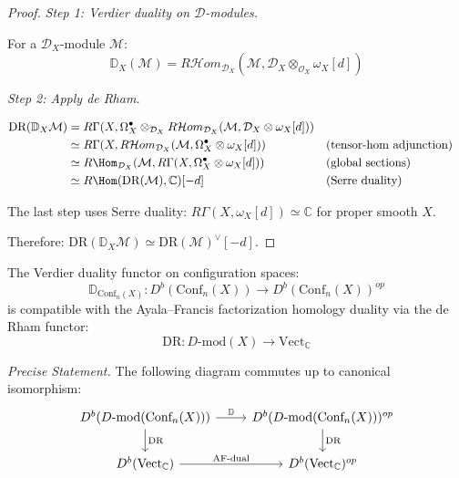 \begin{proof}
\emph{Step 1: Verdier duality on $\mathcal{D}$-modules.}

For a $\mathcal{D}_X$-module $\mathcal{M}$:
\[\mathbb{D}_X(\mathcal{M}) = R\mathcal{H}om_{\mathcal{D}_X}(\mathcal{M}, \mathcal{D}_X \otimes_{\mathcal{O}_X} \omega_X[d])\]

\emph{Step 2: Apply de Rham.}

\begin{align*}
\text{DR}(\mathbb{D}_X \mathcal{M})
&= R\Gamma(X, \Omega^\bullet_X \otimes_{\mathcal{D}_X} R\mathcal{H}om_{\mathcal{D}_X}(\mathcal{M}, \mathcal{D}_X \otimes \omega_X[d])) \\
&\simeq R\Gamma(X, R\mathcal{H}om_{\mathcal{D}_X}(\mathcal{M}, \Omega^\bullet_X \otimes \omega_X[d])) && \text{(tensor-hom adjunction)} \\
&\simeq R\Hom_{\mathcal{D}_X}(\mathcal{M}, R\Gamma(X, \Omega^\bullet_X \otimes \omega_X[d])) && \text{(global sections)} \\
&\simeq R\Hom(\text{DR}(\mathcal{M}), \mathbb{C})[-d] && \text{(Serre duality)}
\end{align*}

The last step uses Serre duality: $R\Gamma(X, \omega_X[d]) \simeq \mathbb{C}$ for proper smooth $X$.

Therefore: $\text{DR}(\mathbb{D}_X \mathcal{M}) \simeq \text{DR}(\mathcal{M})^\vee[-d]$. \qedhere
\end{proof}

\begin{theorem}\label{thm:verdier-AF-compat}
The Verdier duality functor on configuration spaces:
\[\mathbb{D}_{\text{Conf}_n(X)}: D^b(\text{Conf}_n(X)) \to D^b(\text{Conf}_n(X))^{op}\]
is compatible with the Ayala--Francis factorization homology duality via the de Rham functor:
\[\text{DR}: D\text{-mod}(X) \to \text{Vect}_\mathbb{C}\]

\emph{Precise Statement.} The following diagram commutes up to canonical isomorphism:
\[
\begin{tikzcd}
D^b(D\text{-mod}(\text{Conf}_n(X))) \arrow[r, "\mathbb{D}"] \arrow[d, "\text{DR}"]
& D^b(D\text{-mod}(\text{Conf}_n(X)))^{op} \arrow[d, "\text{DR}"] \\
D^b(\text{Vect}_\mathbb{C}) \arrow[r, "\text{AF-dual}"] & D^b(\text{Vect}_\mathbb{C})^{op}
\end{tikzcd}
\]
\end{theorem}

